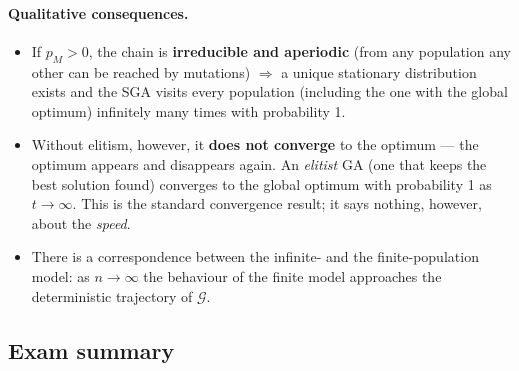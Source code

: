 \documentclass[11pt,a4paper]{article}
\theoremstyle{definition}
\begin{document}
\paragraph{Qualitative consequences.}
\begin{itemize}
\item If $p_M > 0$, the chain is \textbf{irreducible and aperiodic} (from any
  population any other can be reached by mutations) $\Rightarrow$ a unique
  stationary distribution exists and the SGA visits every population (including
  the one with the global optimum) infinitely many times with probability 1.
\item Without elitism, however, it \textbf{does not converge} to the optimum ---
  the optimum appears and disappears again. An \emph{elitist} GA (one that keeps
  the best solution found) converges to the global optimum with probability 1 as
  $t \to \infty$. This is the standard convergence result; it says nothing,
  however, about the \emph{speed}.
\item There is a correspondence between the infinite- and the finite-population
  model: as $n \to \infty$ the behaviour of the finite model approaches the
  deterministic trajectory of $\mathcal{G}$.
\end{itemize}

\subsection{Exam summary}
\end{document}
